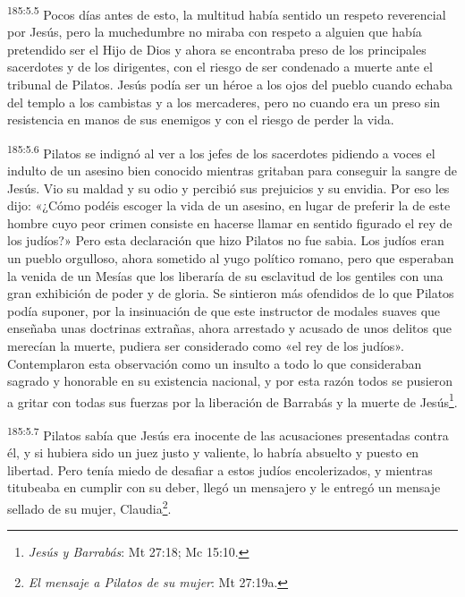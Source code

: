 \par 
\textsuperscript{185:5.5} Pocos días antes de esto, la multitud había sentido un respeto reverencial por Jesús, pero la muchedumbre no miraba con respeto a alguien que había pretendido ser el Hijo de Dios y ahora se encontraba preso de los principales sacerdotes y de los dirigentes, con el riesgo de ser condenado a muerte ante el tribunal de Pilatos. Jesús podía ser un héroe a los ojos del pueblo cuando echaba del templo a los cambistas y a los mercaderes, pero no cuando era un preso sin resistencia en manos de sus enemigos y con el riesgo de perder la vida.

\par 
\textsuperscript{185:5.6} Pilatos se indignó al ver a los jefes de los sacerdotes pidiendo a voces el indulto de un asesino bien conocido mientras gritaban para conseguir la sangre de Jesús. Vio su maldad y su odio y percibió sus prejuicios y su envidia. Por eso les dijo: «¿Cómo podéis escoger la vida de un asesino, en lugar de preferir la de este hombre cuyo peor crimen consiste en hacerse llamar en sentido figurado el rey de los judíos?» Pero esta declaración que hizo Pilatos no fue sabia. Los judíos eran un pueblo orgulloso, ahora sometido al yugo político romano, pero que esperaban la venida de un Mesías que los liberaría de su esclavitud de los gentiles con una gran exhibición de poder y de gloria. Se sintieron más ofendidos de lo que Pilatos podía suponer, por la insinuación de que este instructor de modales suaves que enseñaba unas doctrinas extrañas, ahora arrestado y acusado de unos delitos que merecían la muerte, pudiera ser considerado como «el rey de los judíos». Contemplaron esta observación como un insulto a todo lo que consideraban sagrado y honorable en su existencia nacional, y por esta razón todos se pusieron a gritar con todas sus fuerzas por la liberación de Barrabás y la muerte de Jesús\footnote{\textit{Jesús y Barrabás}: Mt 27:18; Mc 15:10.}.

\par 
\textsuperscript{185:5.7} Pilatos sabía que Jesús era inocente de las acusaciones presentadas contra él, y si hubiera sido un juez justo y valiente, lo habría absuelto y puesto en libertad. Pero tenía miedo de desafiar a estos judíos encolerizados, y mientras titubeaba en cumplir con su deber, llegó un mensajero y le entregó un mensaje sellado de su mujer, Claudia\footnote{\textit{El mensaje a Pilatos de su mujer}: Mt 27:19a.}.

